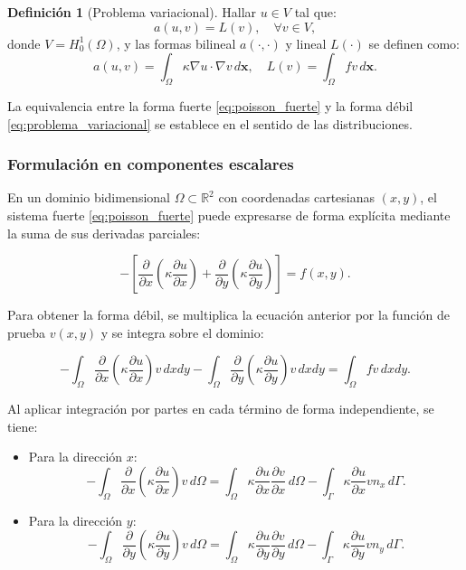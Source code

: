\documentclass[12pt, letterpaper]{report}
\theoremstyle{definition}
\newtheorem{definicion}{Definición}[chapter]
\begin{document}
\begin{definicion}[Problema variacional]
    Hallar $u \in V$ tal que:
    \begin{equation}\label{eq:problema_variacional}
        a(u, v) = L(v), \quad \forall v \in V,
    \end{equation}
    donde $V = H^1_0(\Omega)$, y las formas bilineal $a(\cdot,\cdot)$ y lineal $L(\cdot)$ se definen como:
    \[
    a(u, v) = \int_{\Omega} \kappa \nabla u \cdot \nabla v \, d\mathbf{x}, \quad L(v) = \int_{\Omega} f v \, d\mathbf{x}.
    \]
\end{definicion}

La equivalencia entre la forma fuerte \eqref{eq:poisson_fuerte} y la forma débil \eqref{eq:problema_variacional} se establece en el sentido de las distribuciones.

\subsubsection*{Formulación en componentes escalares}

En un dominio bidimensional $\Omega \subset \mathbb{R}^2$ con coordenadas cartesianas $(x,y)$, el sistema fuerte \eqref{eq:poisson_fuerte} puede expresarse de forma explícita mediante la suma de sus derivadas parciales:

\begin{equation} \label{eq:poisson_fuerte_escalar}
    -\left[ \frac{\partial}{\partial x} \left( \kappa \frac{\partial u}{\partial x} \right) + \frac{\partial}{\partial y} \left( \kappa \frac{\partial u}{\partial y} \right) \right] = f(x,y).
\end{equation}

Para obtener la forma débil, se multiplica la ecuación anterior por la función de prueba $v(x,y)$ y se integra sobre el dominio:

\begin{equation}
    -\int_{\Omega} \frac{\partial}{\partial x} \left( \kappa \frac{\partial u}{\partial x} \right) v \, dx dy - \int_{\Omega} \frac{\partial}{\partial y} \left( \kappa \frac{\partial u}{\partial y} \right) v \, dx dy = \int_{\Omega} f v \, dx dy.
\end{equation}

Al aplicar integración por partes en cada término de forma independiente, se tiene:

\begin{itemize}
    \item Para la dirección $x$: 
    \[ -\int_{\Omega} \frac{\partial}{\partial x} \left( \kappa \frac{\partial u}{\partial x} \right) v \, d\Omega = \int_{\Omega} \kappa \frac{\partial u}{\partial x} \frac{\partial v}{\partial x} \, d\Omega - \int_{\Gamma} \kappa \frac{\partial u}{\partial x} v n_x \, d\Gamma. \]
    \item Para la dirección $y$: 
    \[ -\int_{\Omega} \frac{\partial}{\partial y} \left( \kappa \frac{\partial u}{\partial y} \right) v \, d\Omega = \int_{\Omega} \kappa \frac{\partial u}{\partial y} \frac{\partial v}{\partial y} \, d\Omega - \int_{\Gamma} \kappa \frac{\partial u}{\partial y} v n_y \, d\Gamma. \]
\end{itemize}
\end{document}
